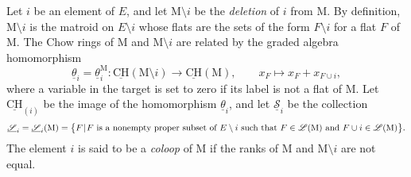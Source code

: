 \documentclass[11pt,reqno]{amsart}
\theoremstyle{definition}
\theoremstyle{remark}
\renewcommand{\(}{\left(}
\renewcommand{\)}{\right)}
\newcommand{\<}{\left<}
\renewcommand{\>}{\right>}
\renewcommand{\mid}{\hspace{0.3mm}|\hspace{0.3mm}}
\begin{document}
Let  $i$ be an element of $E$, and let $\mathrm{M} \setminus i$ be the \emph{deletion} of $i$ from $\mathrm{M}$. 
By definition,  $\mathrm{M} \setminus i$ is the matroid on $E \setminus i$ whose flats are the sets of the form $F \setminus i$ for a flat $F$  of $\mathrm{M}$.
The Chow rings of $\mathrm{M}$ and $\mathrm{M} \setminus i$ are related by the graded algebra homomorphism 
\[
\underline{\theta}_i=\underline{\theta}^\mathrm{M}_i: \underline{\mathrm{CH}}(\mathrm{M} \setminus i) \longrightarrow \underline{\mathrm{CH}}(\mathrm{M}), \qquad x_F \longmapsto x_F + x_{F \cup i},
\]
where a variable in the target is set to zero if its label is not a flat of $\mathrm{M}$. %
Let $\underline{\mathrm{CH}}_{(i)}$ be the image of the homomorphism $\underline{\theta}_i$, and let
$\underline{\mathscr{S}}_i$ be the collection 
\[
\underline{\mathscr{S}}_i=\underline{\mathscr{S}}_i(\mathrm{M})=\big\{F \mid \text{$F$ is a nonempty proper subset of $E \setminus i$ such that $F \in \mathscr{L}(\mathrm{M})$ and $F\cup i \in \mathscr{L}(\mathrm{M})$}\big\}.
\]
The element $i$ is said to be a \emph{coloop} of $\mathrm{M}$ if the ranks of $\mathrm{M}$ and $\mathrm{M} \setminus i$ are not equal.
\end{document}
